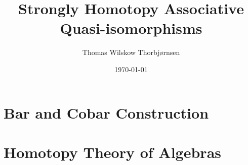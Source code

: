 \documentclass[american,titlepage]{ntnuthesis}
\title{Strongly Homotopy Associative Quasi-isomorphisms}
\author{Thomas Wilskow Thorbjørnsen}
\date{\today}
\begin{document}
    


    \tableofcontents %

    \printglossary[type=\acronymtype] %
    \printglossary                    %


    \chapter{Bar and Cobar Construction}
        

    \chapter{Homotopy Theory of Algebras}
        

    \chapter*{\bibname}
    \printbibliography[heading=none]


    \appendix
\end{document}
